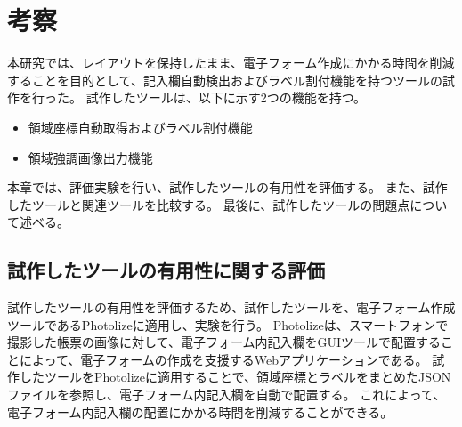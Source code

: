 \chapter{考察}\label{cha:Discussion}
本研究では、レイアウトを保持したまま、電子フォーム作成にかかる時間を削減することを目的として、記入欄自動検出およびラベル割付機能を持つツールの試作を行った。
試作したツールは、以下に示す2つの機能を持つ。

\begin{itemize}
  \item 領域座標自動取得およびラベル割付機能
  \item 領域強調画像出力機能
\end{itemize}

本章では、評価実験を行い、試作したツールの有用性を評価する。
また、試作したツールと関連ツールを比較する。
最後に、試作したツールの問題点について述べる。

\section{試作したツールの有用性に関する評価}\label{sec:evalue_usefulness}
試作したツールの有用性を評価するため、試作したツールを、電子フォーム作成ツールであるPhotolize\cite{Photolize}に適用し、実験を行う。
Photolizeは、スマートフォンで撮影した帳票の画像に対して、電子フォーム内記入欄をGUIツールで配置することによって、電子フォームの作成を支援するWebアプリケーションである。
試作したツールをPhotolizeに適用することで、領域座標とラベルをまとめたJSONファイルを参照し、電子フォーム内記入欄を自動で配置する。
これによって、電子フォーム内記入欄の配置にかかる時間を削減することができる。

